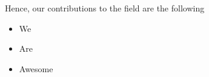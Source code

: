 Hence, our contributions to the field are the following

\begin{itemize}
	\item We
	\item Are
	\item Awesome
\end{itemize}

\hrulefill


